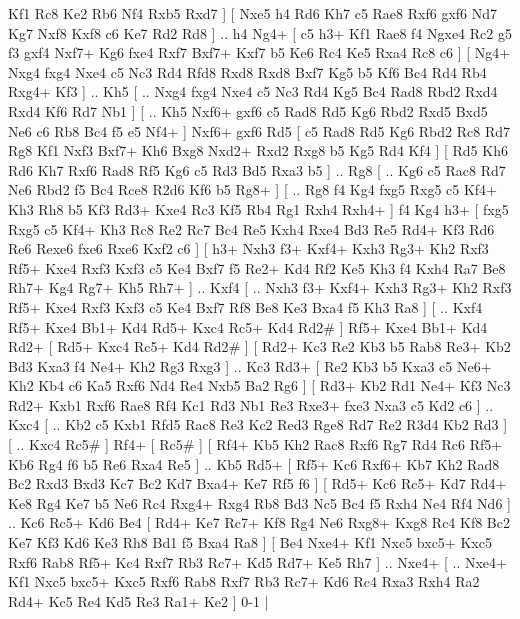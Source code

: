 Kf1 Rc8  Ke2 Rb6  Nf4 Rxb5  Rxd7   ]  [  Nxe5 h4  Rd6 Kh7  c5 Rae8  Rxf6 gxf6  Nd7 Kg7  Nxf8 Kxf8  c6 Ke7  Rd2 Rd8   ] .. h4    Ng4+ [  c5 h3+  Kf1 Rae8  f4 Ngxe4  Rc2 g5  f3 gxf4  Nxf7+ Kg6  fxe4 Rxf7  Bxf7+ Kxf7  b5 Ke6  Rc4 Ke5  Rxa4 Rc8  c6   ]  [  Ng4+ Nxg4  fxg4 Nxe4  c5 Nc3  Rd4 Rfd8  Rxd8 Rxd8  Bxf7 Kg5  b5 Kf6  Bc4 Rd4  Rb4 Rxg4+  Kf3   ] .. Kh5 [ .. Nxg4  fxg4 Nxe4  c5 Nc3  Rd4 Kg5  Bc4 Rad8  Rbd2 Rxd4  Rxd4 Kf6  Rd7 Nb1   ]  [ .. Kh5  Nxf6+ gxf6  c5 Rad8  Rd5 Kg6  Rbd2 Rxd5  Bxd5 Ne6  c6 Rb8  Bc4 f5  e5 Nf4+   ]  Nxf6+   gxf6    Rd5 [  c5 Rad8  Rd5 Kg6  Rbd2 Rc8  Rd7 Rg8  Kf1 Nxf3  Bxf7+ Kh6  Bxg8 Nxd2+  Rxd2 Rxg8  b5 Kg5  Rd4 Kf4   ]  [  Rd5 Kh6  Rd6 Kh7  Rxf6 Rad8  Rf5 Kg6  c5 Rd3  Bd5 Rxa3  b5   ] .. Rg8 [ .. Kg6  c5 Rac8  Rd7 Ne6  Rbd2 f5  Bc4 Rce8  R2d6 Kf6  b5 Rg8+   ]  [ .. Rg8  f4 Kg4  fxg5 Rxg5  c5 Kf4+  Kh3 Rh8  b5 Kf3  Rd3+ Kxe4  Rc3 Kf5  Rb4 Rg1  Rxh4 Rxh4+   ]  f4   Kg4    h3+ [  fxg5 Rxg5  c5 Kf4+  Kh3 Rc8  Re2 Rc7  Bc4 Re5  Kxh4 Rxe4  Bd3 Re5  Rd4+ Kf3  Rd6 Re6  Rexe6 fxe6  Rxe6 Kxf2  c6   ]  [  h3+ Nxh3  f3+ Kxf4+  Kxh3 Rg3+  Kh2 Rxf3  Rf5+ Kxe4  Rxf3 Kxf3  c5 Ke4  Bxf7 f5  Re2+ Kd4  Rf2 Ke5  Kh3 f4  Kxh4 Ra7  Be8 Rh7+  Kg4 Rg7+  Kh5 Rh7+   ] .. Kxf4 [ .. Nxh3  f3+ Kxf4+  Kxh3 Rg3+  Kh2 Rxf3  Rf5+ Kxe4  Rxf3 Kxf3  c5 Ke4  Bxf7 Rf8  Be8 Ke3  Bxa4 f5  Kh3 Ra8   ]  [ .. Kxf4  Rf5+ Kxe4  Bb1+ Kd4  Rd5+ Kxc4  Rc5+ Kd4  Rd2#   ]  Rf5+   Kxe4   Bb1+   Kd4   Rd2+    [  Rd5+ Kxc4  Rc5+ Kd4  Rd2#   ]  [  Rd2+ Kc3  Re2 Kb3  b5 Rab8  Re3+ Kb2  Bd3 Kxa3  f4 Ne4+  Kh2 Rg3  Rxg3   ] .. Kc3    Rd3+ [  Re2 Kb3  b5 Kxa3  c5 Ne6+  Kh2 Kb4  c6 Ka5  Rxf6 Nd4  Re4 Nxb5  Ba2 Rg6   ]  [  Rd3+ Kb2  Rd1 Ne4+  Kf3 Nc3  Rd2+ Kxb1  Rxf6 Rae8  Rf4 Kc1  Rd3 Nb1  Re3 Rxe3+  fxe3 Nxa3  c5 Kd2  c6   ] .. Kxc4 [ .. Kb2  c5 Kxb1  Rfd5 Rac8  Re3 Kc2  Red3 Rge8  Rd7 Re2  R3d4 Kb2  Rd3   ]  [ .. Kxc4  Rc5#   ]  Rf4+    [  Rc5#   ]  [  Rf4+ Kb5  Kh2 Rac8  Rxf6 Rg7  Rd4 Rc6  Rf5+ Kb6  Rg4 f6  b5 Re6  Rxa4 Re5   ] .. Kb5    Rd5+ [  Rf5+ Kc6  Rxf6+ Kb7  Kh2 Rad8  Bc2 Rxd3  Bxd3 Kc7  Bc2 Kd7  Bxa4+ Ke7  Rf5 f6   ]  [  Rd5+ Kc6  Rc5+ Kd7  Rd4+ Ke8  Rg4 Ke7  b5 Ne6  Rc4 Rxg4+  Rxg4 Rb8  Bd3 Nc5  Bc4 f5  Rxh4 Ne4  Rf4 Nd6   ] .. Kc6    Rc5+   Kd6    Be4 [  Rd4+ Ke7  Rc7+ Kf8  Rg4 Ne6  Rxg8+ Kxg8  Rc4 Kf8  Bc2 Ke7  Kf3 Kd6  Ke3 Rh8  Bd1 f5  Bxa4 Ra8   ]  [  Be4 Nxe4+  Kf1 Nxc5  bxc5+ Kxc5  Rxf6 Rab8  Rf5+ Kc4  Rxf7 Rb3  Rc7+ Kd5  Rd7+ Ke5  Rh7   ] .. Nxe4+    [ .. Nxe4+  Kf1 Nxc5  bxc5+ Kxc5  Rxf6 Rab8  Rxf7 Rb3  Rc7+ Kd6  Rc4 Rxa3  Rxh4 Ra2  Rd4+ Kc5  Re4 Kd5  Re3 Ra1+  Ke2   ] 0-1  |
